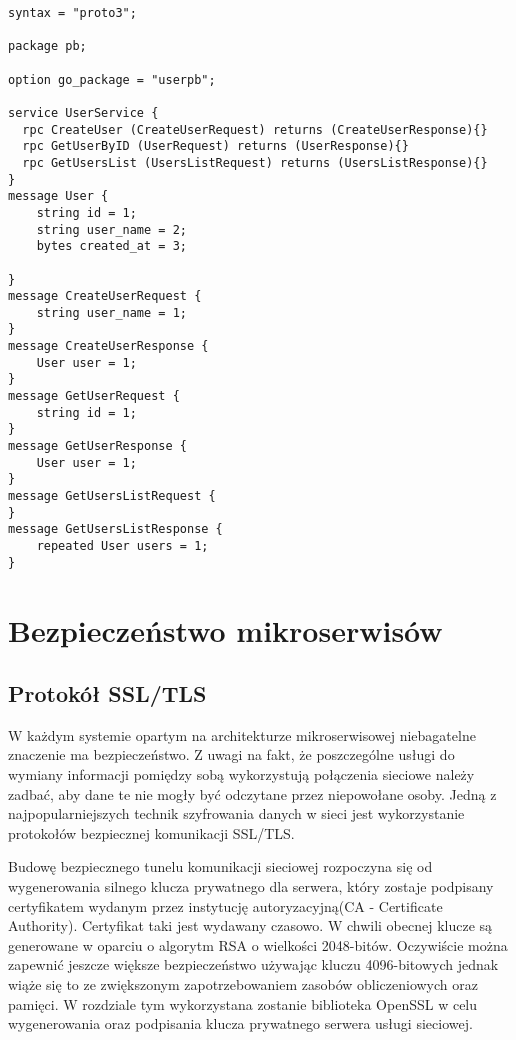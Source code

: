 \begin{lstlisting}[language=IDL, caption=Definicje usług i komunikatów dla usługi użytkownicy] 
syntax = "proto3";

package pb;

option go_package = "userpb";

service UserService {
  rpc CreateUser (CreateUserRequest) returns (CreateUserResponse){}
  rpc GetUserByID (UserRequest) returns (UserResponse){}
  rpc GetUsersList (UsersListRequest) returns (UsersListResponse){}
}
message User {
    string id = 1;
    string user_name = 2;
    bytes created_at = 3;

}
message CreateUserRequest {
    string user_name = 1;
}
message CreateUserResponse {
    User user = 1;
}
message GetUserRequest {
    string id = 1;
}
message GetUserResponse {
    User user = 1;
}
message GetUsersListRequest {
}
message GetUsersListResponse {
    repeated User users = 1;
}
\end{lstlisting}

\section{Bezpieczeństwo mikroserwisów}
\subsection{Protokół SSL/TLS}
\par W każdym systemie opartym na architekturze mikroserwisowej niebagatelne znaczenie ma bezpieczeństwo. Z uwagi na fakt, że poszczególne usługi do wymiany informacji pomiędzy sobą wykorzystują połączenia sieciowe należy zadbać, aby dane te nie mogły być odczytane przez niepowołane osoby. Jedną z najpopularniejszych technik szyfrowania danych w sieci jest wykorzystanie protokołów bezpiecznej komunikacji SSL/TLS.
\par Budowę bezpiecznego tunelu komunikacji sieciowej rozpoczyna się od wygenerowania silnego klucza prywatnego dla serwera, który zostaje podpisany certyfikatem wydanym przez instytucję autoryzacyjną(CA - Certificate Authority). Certyfikat taki jest wydawany czasowo. W chwili obecnej klucze są generowane w oparciu o algorytm RSA o wielkości 2048-bitów. Oczywiście można zapewnić jeszcze większe bezpieczeństwo używając kluczu 4096-bitowych jednak wiąże się to ze zwiększonym zapotrzebowaniem zasobów obliczeniowych oraz pamięci. W rozdziale tym wykorzystana zostanie biblioteka OpenSSL w celu wygenerowania oraz podpisania klucza prywatnego serwera usługi sieciowej. 
